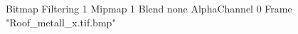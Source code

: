 {Bitmap
	{Filtering 1}
	{Mipmap 1}
	{Blend none}
	{AlphaChannel 0}
	{Frame "Roof_metall_x.tif.bmp"}
}
